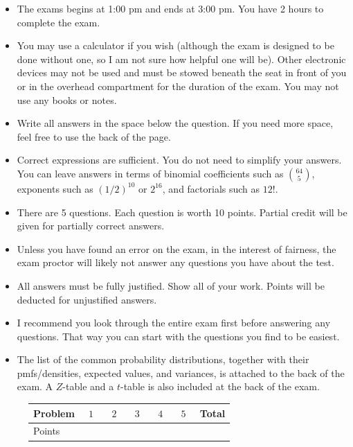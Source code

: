 \documentclass[12pt]{article}
\begin{document}
\begin{itemize}
\item The exams begins at 1:00 pm and ends at 3:00 pm. You have 2 hours to complete the exam.
\item You may use a calculator if you wish (although the exam is designed to be done without one, so I am not sure how helpful one will be). Other electronic devices may not be used and must be stowed beneath the seat in front of you or in the overhead compartment for the duration of the exam. You may not use any books or notes. 
\item Write all answers in the space below the question. If you need more space, feel free to use the back of the page.
\item Correct expressions are sufficient. You do not need to simplify your answers. You can leave answers in terms of binomial coefficients such as $\binom{64}{5}$, exponents such as $(1/2)^{10}$ or $2^{16}$, and factorials such as $12!$.
\item There are 5 questions. Each question is worth 10 points. Partial credit will be given for partially correct answers.
\item Unless you have found an error on the exam, in the interest of fairness, the exam proctor will likely not answer any questions you have about the test.
\item All answers must be fully justified. Show all of your work. Points will be deducted for unjustified answers.
\item I recommend you look through the entire exam first before answering any questions. That way you can start with the questions you find to be easiest.
\item The list of the common probability distributions, together with their pmfs/densities, expected values, and variances, is attached to the back of the exam. A $Z$-table and a $t$-table is also included at the back of the exam.
\end{itemize}

\begin{figure}[H]
\centering
\label{my-label}
\begin{tabular}{|l|l|l|l|l|l|l|}
\hline
Problem & $\:\:1\:\:$ & $\:\:2\:\:$ & $\:\:3\:\:$ & $\:\:4\:\:$ & $\:\:5\:\:$ & Total \\ \hline
Points  &   &   &   &   &   &       \\ \hline
\end{tabular}
\end{figure}
\end{document}

